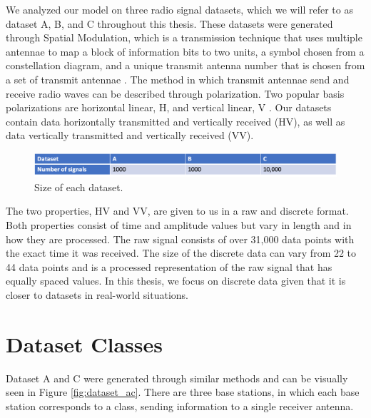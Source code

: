 \documentclass{turabian-thesis}
\begin{document}
We analyzed our model on three radio signal datasets, which we will refer to as dataset A, B, and C throughout this thesis. These datasets were generated through Spatial Modulation, which is a transmission technique that uses multiple antennae to map a block of information bits to two units, a symbol chosen from a constellation diagram, and a unique transmit antenna number that is chosen from a set of transmit antennae \cite{mesleh_spatial_2008}. The method in which transmit antennae send and receive radio waves can be described through polarization. Two popular basis polarizations are horizontal linear, H, and vertical linear, V \cite{oshea_convolutional_2016}. Our datasets contain data horizontally transmitted and vertically received (HV), as well as data vertically transmitted and vertically received (VV).

\begin{figure}[h!]
   \begin{center}
      \includegraphics[scale=0.5]{../media/dataset_info.png}
   \end{center}
   \caption{Size of each dataset.}
   \label{fig:dataset_info}
\end{figure}

The two properties, HV and VV, are given to us in a raw and discrete format. Both properties consist of time and amplitude values but vary in length and in how they are processed. The raw signal consists of over 31,000 data points with the exact time it was received. The size of the discrete data can vary from 22 to 44 data points and is a processed representation of the raw signal that has equally spaced values. In this thesis, we focus on discrete data given that it is closer to datasets in real-world situations.

\section{Dataset Classes}

Dataset A and C were generated through similar methods and can be visually seen in Figure \ref{fig:dataset_ac}. There are three base stations, in which each base station corresponds to a class, sending information to a single receiver antenna.
\end{document}
